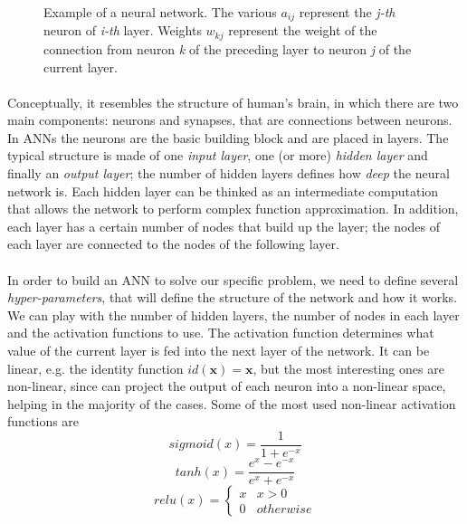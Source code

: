 \begin{figure}[h]
    \centering
    
    \caption{Example of a neural network. The various $a_{ij}$ represent the \textit{j-th} neuron of \textit{i-th} layer. Weights $w_{kj}$ represent the weight of the connection from neuron \textit{k} of the preceding layer to neuron \textit{j} of the current layer.}
\end{figure}

\paragraph{}
Conceptually, it resembles the structure of human's brain, in which there are two main components: neurons and synapses, that are connections between neurons. In ANNs the neurons are the basic building block and are placed in layers. The typical structure is made of one \textit{input layer}, one (or more) \textit{hidden layer} and finally an \textit{output layer}; the number of hidden layers defines how \textit{deep} the neural network is. Each hidden layer can be thinked as an intermediate computation that allows the network to perform complex function approximation. \newline
In addition, each layer has a certain number of nodes that build up the layer; the nodes of each layer are connected to the nodes of the following layer.  

\paragraph{}
In order to build an ANN to solve our specific problem, we need to define several \textit{hyper-parameters}, that will define the structure of the network and how it works. We can play with the number of hidden layers, the number of nodes in each layer and the activation functions to use. The activation function determines what value of the current layer is fed into the next layer of the network. It can be linear, e.g. the identity function $id(\textbf{x}) = \textbf{x}$, but the most interesting ones are non-linear, since can project the output of each neuron into a non-linear space, helping in the majority of the cases. \newline
Some of the most used non-linear activation functions are
\begin{equation}
    sigmoid(x) = \frac{1}{1 + e^{-x}}
\end{equation}
\begin{equation}
    tanh(x) = \frac{e^x - e^{-x}}{e^x + e^{-x}}
\end{equation}
\begin{equation}
    relu(x) = \begin{cases} 
                  x & x > 0 \\
                  0 & otherwise
               \end{cases}
\end{equation}

